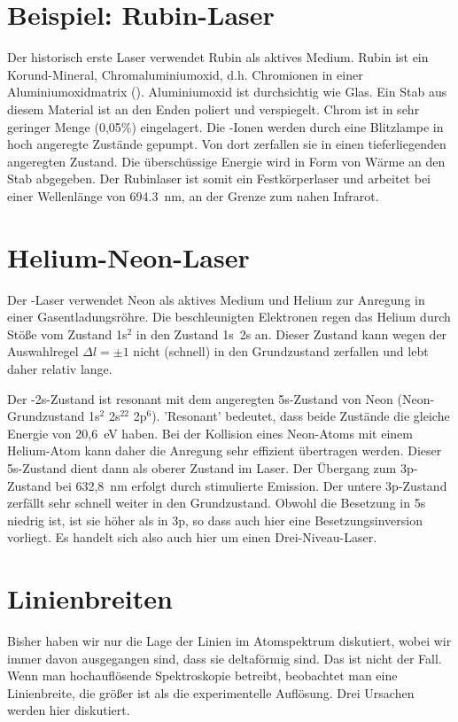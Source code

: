 \section{Beispiel: Rubin-Laser}

Der historisch erste Laser verwendet Rubin als aktives Medium. Rubin ist ein Korund-Mineral, Chromaluminiumoxid, d.h. Chromionen in einer Aluminiumoxidmatrix (). Aluminiumoxid ist durchsichtig wie Glas. Ein Stab aus diesem Material ist an den Enden poliert und verspiegelt. Chrom ist in sehr geringer Menge (0,05\%) eingelagert. Die -Ionen werden durch eine Blitzlampe in hoch angeregte Zustände gepumpt. Von dort zerfallen sie in einen tieferliegenden angeregten Zustand. Die überschüssige Energie wird in Form von Wärme an den Stab abgegeben. Der Rubinlaser ist somit ein Festkörperlaser und arbeitet bei einer Wellenlänge von 694.3~nm, an der Grenze zum nahen Infrarot. 

\section{Helium-Neon-Laser}

Der -Laser verwendet Neon als aktives Medium und Helium zur Anregung in einer Gasentladungsröhre. Die beschleunigten Elektronen regen das Helium durch Stöße vom Zustand 1s$^2$ in den Zustand 1s~2s an. Dieser Zustand kann wegen der Auswahlregel $\Delta l = \pm1$ nicht (schnell) in den Grundzustand zerfallen und lebt daher relativ lange. 

Der -2s-Zustand ist resonant mit dem angeregten 5s-Zustand von Neon (Neon-Grundzustand 1s$^2$ 2s$^22$ 2p$^6$). 'Resonant' bedeutet, dass beide Zustände die gleiche Energie von 20,6~eV haben.  Bei der Kollision eines Neon-Atoms mit einem Helium-Atom kann daher die Anregung sehr effizient übertragen werden. Dieser 5s-Zustand dient dann als oberer Zustand im Laser. Der Übergang zum 3p-Zustand bei 632,8~nm erfolgt durch stimulierte Emission. Der untere 3p-Zustand zerfällt sehr schnell weiter in den Grundzustand. Obwohl die Besetzung in 5s niedrig ist, ist sie höher als in 3p, so dass auch hier eine Besetzungsinversion vorliegt. Es handelt sich also auch hier um einen Drei-Niveau-Laser.


\section{Linienbreiten}

Bisher haben wir nur die Lage der Linien im Atomspektrum diskutiert, wobei wir immer davon ausgegangen sind, dass sie deltaförmig sind. Das ist nicht der Fall. Wenn man hochauflösende Spektroskopie betreibt, beobachtet man eine Linienbreite, die größer ist als die experimentelle Auflösung. Drei Ursachen werden hier diskutiert.

